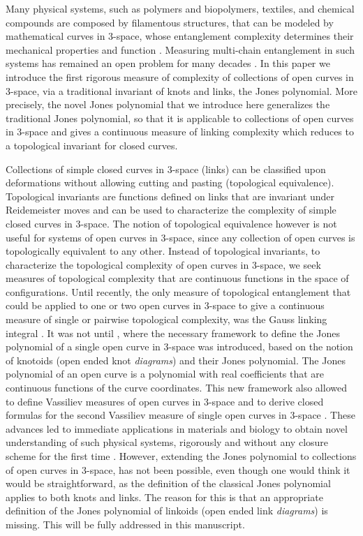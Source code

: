 \documentclass{article}
\begin{document}
Many physical systems, such as polymers and biopolymers, textiles, and chemical compounds are composed by filamentous structures, that can be modeled by mathematical curves in 3-space, whose entanglement complexity determines their mechanical properties and function \cite{Arsuaga2005,Ricca2007,Taylor1974,Sulkowska2012,Qin2011,Panagiotou2019,Liu2018,Edwards1967}. Measuring multi-chain entanglement in such systems has remained an open problem for many decades \cite{Edwards1967,Edwards1968,DeGennes1974}. In this paper we introduce the first rigorous measure of complexity of collections of open curves in 3-space, via a traditional invariant of knots and links, the Jones polynomial. More precisely, the novel Jones polynomial that we introduce here generalizes the traditional Jones polynomial, so that it is applicable to collections of open curves in 3-space and gives a continuous measure of linking complexity which reduces to a topological invariant for closed curves.   

Collections of simple closed curves in 3-space (links) can be classified upon deformations without allowing cutting and pasting (topological equivalence). Topological invariants are functions defined on links that are invariant under Reidemeister moves and can be used to characterize the complexity of simple closed curves in 3-space. The notion of topological equivalence however is not useful for systems of open curves in 3-space, since any collection of open curves is topologically equivalent to any other. Instead of topological invariants, to characterize the topological complexity of open curves in 3-space, we seek measures of topological complexity that are continuous functions in the space of configurations. Until recently, the only measure of topological entanglement that could be applied to one or two open curves in 3-space to give a continuous measure of single or pairwise topological complexity, was the Gauss linking integral \cite{Gauss1877,Panagiotou2011, Panagiotou2013b,Panagiotou2014,Panagiotou2015}.  It was not until \cite{Panagiotou2020b}, where the necessary framework to define the Jones polynomial of a single open curve in 3-space was introduced, based on the notion of knotoids (open ended knot \textit{diagrams}) and their Jones polynomial. The Jones polynomial of an open curve is a polynomial with real coefficients that are continuous functions of the curve coordinates. This new framework also allowed to define Vassiliev measures of open curves in 3-space and to derive closed formulas for the second Vassiliev measure of single open curves in 3-space \cite{Panagiotou2021}. These advances led to immediate applications in materials and biology to obtain novel understanding of such physical systems, rigorously and without any closure scheme for the first time \cite{Herschberg2021,Smith2022,Wang2022}.   However, extending the Jones polynomial to collections of open curves in 3-space, has not been possible, even though one would think it would be straightforward, as the definition of the classical Jones polynomial applies to both knots and links. The reason for this is that an appropriate definition of the Jones polynomial of linkoids (open ended link \textit{diagrams}) is missing. This will be fully addressed in this manuscript.
\end{document}
